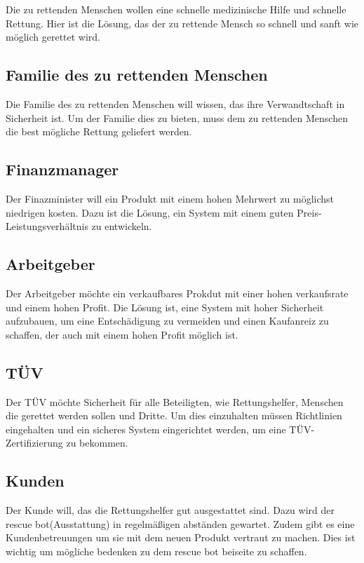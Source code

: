 \documentclass[conference]{IEEEtran}
\begin{document}
Die zu rettenden Menschen wollen eine schnelle medizinische Hilfe und schnelle Rettung.
Hier ist die Lösung, das der zu rettende Mensch so schnell und sanft wie möglich gerettet wird.

\subsection{Familie des zu rettenden Menschen}

Die Familie des zu rettenden Menschen will wissen, das ihre Verwandtschaft in Sicherheit ist.
Um der Familie dies zu bieten, muss dem zu rettenden Menschen die best mögliche Rettung geliefert werden.

\subsection{Finanzmanager}

Der Finazminister will ein Produkt mit einem hohen Mehrwert zu möglichst niedrigen kosten.
Dazu ist die Lösung, ein System mit einem guten Preis-Leistungsverhältnis zu entwickeln.

\subsection{Arbeitgeber}

Der Arbeitgeber möchte ein verkaufbares Prokdut mit einer hohen verkaufsrate und einem hohen Profit.
Die Lösung ist, eine System mit hoher Sicherheit aufzubauen, um eine Entschädigung zu vermeiden und einen Kaufanreiz zu schaffen, der auch mit einem hohen Profit möglich ist.

\subsection{TÜV}

Der TÜV möchte Sicherheit für alle Beteiligten, wie Rettungshelfer, Menschen die gerettet werden sollen und Dritte.
Um dies einzuhalten müssen Richtlinien eingehalten und ein sicheres System eingerichtet werden, um eine TÜV-Zertifizierung zu bekommen. 

\subsection{Kunden}

Der Kunde will, das die Rettungshelfer gut ausgestattet sind.
Dazu wird der rescue bot(Ausstattung) in regelmäßigen abständen gewartet. Zudem gibt es eine Kundenbetreuungen um sie mit dem neuen Produkt vertraut zu machen. Dies ist wichtig um mögliche bedenken zu dem rescue bot beiseite zu schaffen.
\\
\end{document}
